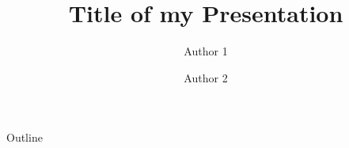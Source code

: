 \documentclass{beamer}
\title[Final Presentation] {Title of my Presentation }
\author[Author 1, Author 2] {Author 1 \and Author 2}
\begin{document}
\begin{frame}
    \titlepage
\end{frame}


\begin{frame}{Outline}
\tableofcontents
\end{frame}
\end{document}
